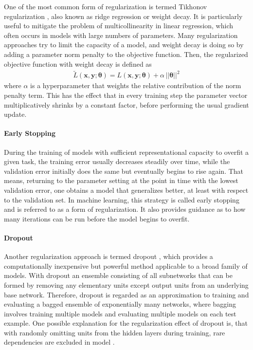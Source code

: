 \documentclass{scrartcl}
\begin{document}
One of the most common  form of regularization is termed Tikhonov regularization \cite{Tikhonov1943}, also known as ridge regression or weight decay. It is particularly useful to mitigate the problem of multicollinearity in linear regression, which often occurs in models with large numbers of parameters. Many regularization approaches try to limit the capacity of a model, and weight decay is doing so by adding a parameter norm penalty to the objective function. Then, the regularized objective function with weight decay is defined as
\begin{align}
\tilde L(\mathbf x, \mathbf y; \boldsymbol \theta) = L(\mathbf x, \mathbf y; \boldsymbol \theta) + \alpha \,||\boldsymbol \theta||^2
\end{align} 
where $\alpha$ is a hyperparameter that weights the relative contribution of the norm penalty term. This has the effect that in every training step the parameter vector multiplicatively shrinks by a constant factor, before performing the usual gradient update. 


\paragraph{Early Stopping} 

During the training of models with sufficient representational capacity to overfit a given task, the training error usually decreases steadily over time, while the validation error initially does the same but eventually begins to rise again. That means, returning to the parameter setting at the point in time with the lowest validation error, one obtains a model that generalizes better, at least with respect to the validation set. In machine learning, this strategy is called early stopping and is referred to as a form of regularization. It also provides guidance as to how many iterations can be run before the model begins to overfit. 



\paragraph{Dropout} Another regularization approach is termed dropout \cite{Srivastava2014}, which provides a computationally inexpensive but powerful method applicable to a broad family of models. With dropout an ensemble consisting of all subnetworks that can be formed by removing any elementary units except output units from an underlying base network. Therefore, dropout is regarded as an approximation to training and evaluating a bagged ensemble of exponentially many networks, where bagging involves training multiple models and evaluating multiple models on each test example. One possible explanation for the re\-gu\-larization effect of dropout is, that with randomly omitting units from the hidden layers during training, rare dependencies are excluded in model \cite{Dahl2013}.
\end{document}
